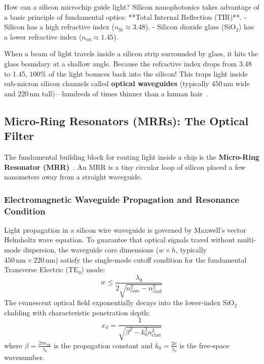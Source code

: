 How can a silicon microchip guide light? Silicon nanophotonics takes advantage of a basic principle of fundamental optics: **Total Internal Reflection (TIR)**. 
- Silicon has a high refractive index ($n_{\mathrm{Si}} \approx 3.48$).
- Silicon dioxide glass ($\mathrm{SiO_2}$) has a lower refractive index ($n_{\mathrm{ox}} \approx 1.45$).

When a beam of light travels inside a silicon strip surrounded by glass, it hits the glass boundary at a shallow angle. Because the refractive index drops from 3.48 to 1.45, $100\%$ of the light bounces back into the silicon! This traps light inside sub-micron silicon channels called \textbf{optical waveguides} (typically $450\,\mathrm{nm}$ wide and $220\,\mathrm{nm}$ tall)—hundreds of times thinner than a human hair~\cite{Little1997,Kao2026}.

\subsection{Micro-Ring Resonators (MRRs): The Optical Filter}

The fundamental building block for routing light inside a chip is the \textbf{Micro-Ring Resonator (MRR)}~\cite{Little1997}. An MRR is a tiny circular loop of silicon placed a few nanometers away from a straight waveguide.

\subsubsection{Electromagnetic Waveguide Propagation and Resonance Condition}
Light propagation in a silicon wire waveguide is governed by Maxwell's vector Helmholtz wave equation. To guarantee that optical signals travel without multi-mode dispersion, the waveguide core dimensions ($w \times h$, typically $450\,\mathrm{nm} \times 220\,\mathrm{nm}$) satisfy the single-mode cutoff condition for the fundamental Transverse Electric ($\mathrm{TE}_0$) mode:
\begin{equation}
w \le \frac{\lambda_0}{2 \sqrt{n_{\mathrm{core}}^2 - n_{\mathrm{clad}}^2}}
\label{eq:waveguide_cutoff}
\end{equation}
The evanescent optical field exponentially decays into the lower-index $\mathrm{SiO_2}$ cladding with characteristic penetration depth:
\begin{equation}
x_d = \frac{1}{\sqrt{\beta^2 - k_0^2 n_{\mathrm{clad}}^2}}
\end{equation}
where $\beta = \frac{2\pi n_{\mathrm{eff}}}{\lambda_0}$ is the propagation constant and $k_0 = \frac{2\pi}{\lambda_0}$ is the free-space wavenumber.


